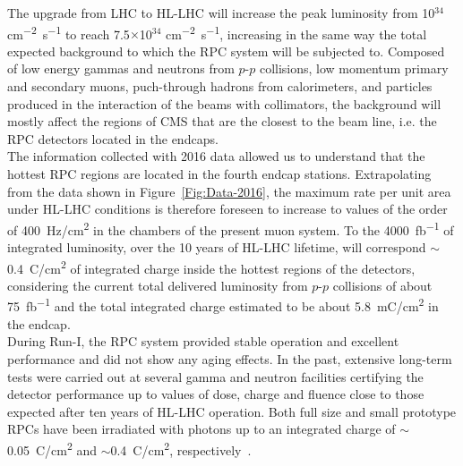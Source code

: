 		The upgrade from LHC to HL-LHC will increase the peak luminosity from 10$^{34}$ \si{cm^{-2}.s^{-1}} to reach 7.5$\times$10$^{34}$ \si{cm^{-2}.s^{-1}}, increasing in the same way the total expected background to which the RPC system will be subjected to. Composed of low energy gammas and neutrons from $p$-$p$ collisions, low momentum primary and secondary muons, puch-through hadrons from calorimeters, and particles produced in the interaction of the beams with collimators, the background will mostly affect the regions of CMS that are the closest to the beam line, i.e. the RPC detectors located in the endcaps.\\
	    The information collected with 2016 data allowed us to understand that the hottest RPC regions are located in the fourth endcap stations. Extrapolating from the data shown in Figure~\ref{Fig:Data-2016}, the maximum rate per unit area under HL-LHC conditions is therefore foreseen to increase to values of the order of \SI{400}{Hz/cm^2} in the chambers of the present muon system. To the \SI{4000}{fb^{-1}} of integrated luminosity, over the 10 years of HL-LHC lifetime, will correspond $\sim$\SI{0.4}{C/cm^2} of integrated charge inside the hottest regions of the detectors, considering the current total delivered luminosity from $p$-$p$ collisions of about \SI{75}{fb^{-1}} and the total integrated charge estimated to be about \SI{5.8}{mC/cm^2} in the endcap.\\
	    During Run-I, the RPC system provided stable operation and excellent performance and did not show any aging effects. In the past, extensive long-term tests were carried out at several gamma and neutron facilities certifying the detector performance up to values of dose, charge and fluence close to those expected after ten years of HL-LHC operation. Both full size and small prototype RPCs have been irradiated with photons up to an integrated charge of $\sim$\SI{0.05}{C/cm^2} and $\sim$\SI{0.4}{C/cm^2}, respectively~\cite{GIF2004,AGING2009}.\\
	    
